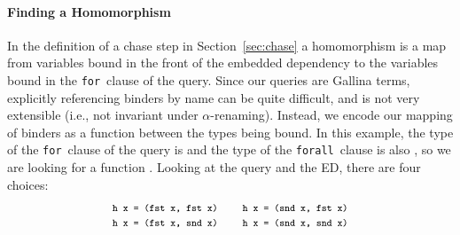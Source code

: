 \documentclass{sigplanconf}
\newcommand{\FOR}{{\tt for}\relax\ifmmode\ \else\xspace\fi}
\newcommand{\FORALL}{{\tt forall}\relax\ifmmode\ \else\xspace\fi}
\begin{document}
\paragraph{Finding a Homomorphism}
In the definition of a chase step in Section~\ref{sec:chase} a homomorphism is a map from variables bound in the front of the embedded dependency to the variables bound in the \FOR clause of the query.
Since our queries are Gallina terms, explicitly referencing binders by name can be quite difficult, and is not very extensible (i.e., not invariant under $\alpha$-renaming).
Instead, we encode our mapping of binders as a function between the types being bound.
In this example, the type of the \FOR clause of the query is  and the type of the \FORALL clause is also , so we are looking for a function .
Looking at the query and the ED, there are four choices:
\[\begin{array}{lcl}
\footnotesize\texttt{h x = (fst x, fst x)} & & \footnotesize\texttt{h x = (snd x, fst x)} \\
\footnotesize\texttt{h x = (fst x, snd x)} & & \footnotesize\texttt{h x = (snd x, snd x)} \\
\end{array}
\]
\end{document}

